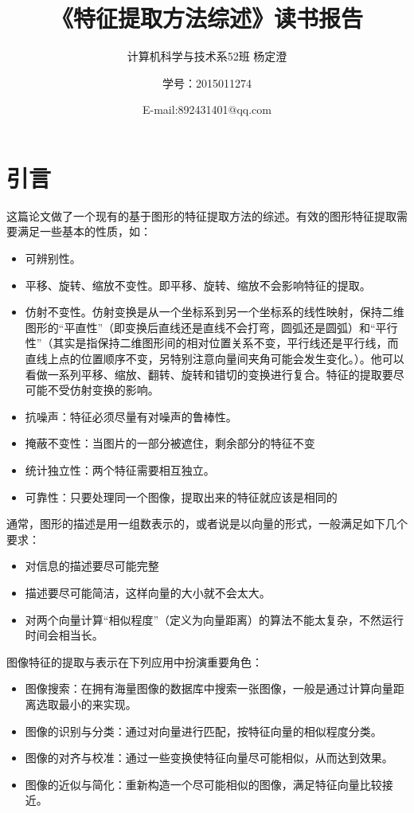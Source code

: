 \documentclass{ctexart}
\begin{document}
\title{《特征提取方法综述》读书报告}
\author{计算机科学与技术系52班 杨定澄 \and 学号：2015011274 \and E-mail:892431401@qq.com}
\date{}
\maketitle
\section{引言}
这篇论文做了一个现有的基于图形的特征提取方法的综述。有效的图形特征提取需要满足一些基本的性质，如：

\begin{itemize}
\item 可辨别性。
\item 平移、旋转、缩放不变性。即平移、旋转、缩放不会影响特征的提取。
\item 仿射不变性。仿射变换是从一个坐标系到另一个坐标系的线性映射，保持二维图形的“平直性”（即变换后直线还是直线不会打弯，圆弧还是圆弧）和“平行性”（其实是指保持二维图形间的相对位置关系不变，平行线还是平行线，而直线上点的位置顺序不变，另特别注意向量间夹角可能会发生变化。）。他可以看做一系列平移、缩放、翻转、旋转和错切的变换进行复合。特征的提取要尽可能不受仿射变换的影响。
\item 抗噪声：特征必须尽量有对噪声的鲁棒性。
\item 掩蔽不变性：当图片的一部分被遮住，剩余部分的特征不变
\item 统计独立性：两个特征需要相互独立。
\item 可靠性：只要处理同一个图像，提取出来的特征就应该是相同的
\end{itemize}

通常，图形的描述是用一组数表示的，或者说是以向量的形式，一般满足如下几个要求：

\begin{itemize}
\item 对信息的描述要尽可能完整
\item 描述要尽可能简洁，这样向量的大小就不会太大。
\item 对两个向量计算“相似程度”（定义为向量距离）的算法不能太复杂，不然运行时间会相当长。
\end{itemize}

图像特征的提取与表示在下列应用中扮演重要角色：

\begin{itemize}
\item 图像搜索：在拥有海量图像的数据库中搜索一张图像，一般是通过计算向量距离选取最小的来实现。
\item 图像的识别与分类：通过对向量进行匹配，按特征向量的相似程度分类。
\item 图像的对齐与校准：通过一些变换使特征向量尽可能相似，从而达到效果。
\item 图像的近似与简化：重新构造一个尽可能相似的图像，满足特征向量比较接近。
\end{itemize}
\end{document}
